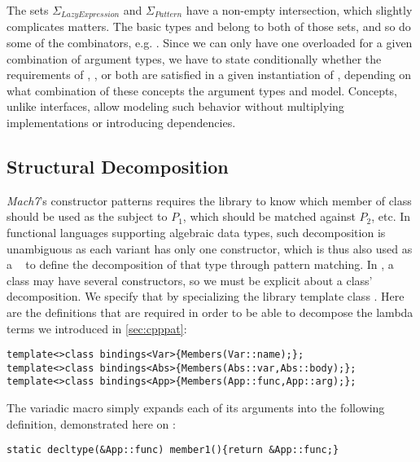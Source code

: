 The sets $\Sigma_{LazyExpression}$ and $\Sigma_{Pattern}$ have a non-empty intersection, which 
slightly complicates matters. The basic types  and  
belong to both of those sets, and so do some of the combinators, e.g. 
. Since we can only have one overloaded  for 
a given combination of argument types, we have to state conditionally whether the
requirements of , , or both are satisfied in a 
given instantiation of , depending on what combination 
of these concepts the argument types  and  model. Concepts, 
unlike interfaces, allow modeling such behavior without multiplying 
implementations or introducing dependencies.

\subsection{Structural Decomposition}
\label{sec:bnd}

\emph{Mach7}'s constructor patterns  requires the 
library to know which member of class  should be used as the subject to 
$P_1$, which should be matched against $P_2$, etc. In functional languages 
supporting algebraic data types, such decomposition is unambiguous as each 
variant has only one constructor, which is thus also used as a ~\cite{padl08,Thorn2012} to define the
decomposition of that type through pattern matching. In \Cpp{}, a class may have 
several constructors, so we must be explicit about a class' decomposition.
We specify that by specializing the library template class . 
Here are the definitions that are required in order to be able to decompose the 
lambda terms we introduced in \textsection\ref{sec:cpppat}:

\begin{lstlisting}
template<>class bindings<Var>{Members(Var::name);};
template<>class bindings<Abs>{Members(Abs::var,Abs::body);};
template<>class bindings<App>{Members(App::func,App::arg);};
\end{lstlisting}

\noindent
The variadic macro  simply expands each of its arguments into the 
following definition, demonstrated here on :

\begin{lstlisting}
static decltype(&App::func) member1(){return &App::func;}
\end{lstlisting}

